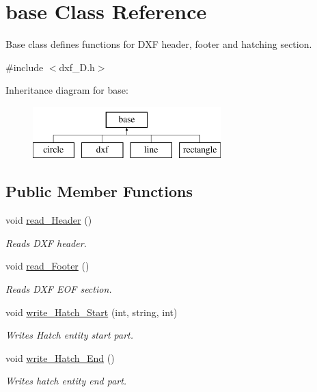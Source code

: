 \hypertarget{classbase}{\section{base Class Reference}
\label{classbase}
}


Base class defines functions for D\-X\-F header, footer and hatching section.  




{\ttfamily \#include $<$dxf\-\_\-D.\-h$>$}

Inheritance diagram for base\-:\begin{figure}[H]
\begin{center}
\leavevmode
\includegraphics[height=2.000000cm]{classbase}
\end{center}
\end{figure}
\subsection*{Public Member Functions}
\begin{DoxyCompactItemize}
\item 
void \hyperlink{classbase_a7db4428cce94f69118405d98e6c239ee}{read\-\_\-\-Header} ()
\begin{DoxyCompactList}\small\item\em Reads D\-X\-F header. \end{DoxyCompactList}\item 
void \hyperlink{classbase_a03a4fcadee3375d5cb13195f82784450}{read\-\_\-\-Footer} ()
\begin{DoxyCompactList}\small\item\em Reads D\-X\-F E\-O\-F section. \end{DoxyCompactList}\item 
void \hyperlink{classbase_af4743cfcd16393cfc86bbcfd854a0727}{write\-\_\-\-Hatch\-\_\-\-Start} (int, string, int)
\begin{DoxyCompactList}\small\item\em Writes Hatch entity start part. \end{DoxyCompactList}\item 
void \hyperlink{classbase_acae9199dd5ca813b319665e8aa963bad}{write\-\_\-\-Hatch\-\_\-\-End} ()
\begin{DoxyCompactList}\small\item\em Writes hatch entity end part. \end{DoxyCompactList}\end{DoxyCompactItemize}
